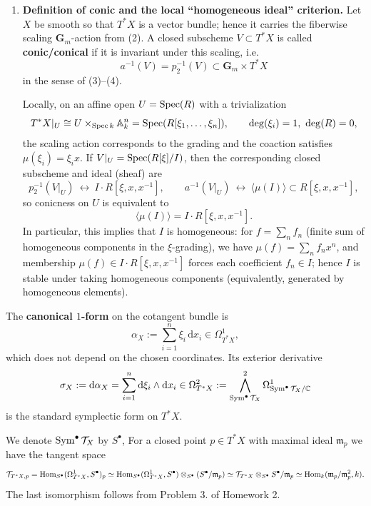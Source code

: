 \begin{remark}
\begin{enumerate}
        \item \textbf{Definition of conic and the local ``homogeneous ideal'' criterion.}
              Let $X$ be smooth so that $T^*X$ is a vector bundle; hence it carries the fiberwise scaling
              $\mathbf G_m$-action from (2). A closed subscheme $V\subset T^*X$ is called \textbf{conic/conical}
              if it is invariant under this scaling, i.e.
              \[
                  a^{-1}(V)=p_2^{-1}(V)\subset \mathbf G_m\times T^*X
              \]
              in the sense of (3)--(4).

              Locally, on an affine open $U=\operatorname{Spec}(R)$ with a trivialization
              \[
                  T^*X|_U \cong U\times_{\operatorname{Spec} k}\mathbb A^n_{k} = \operatorname{Spec}(R[\xi_1,\dots,\xi_n]),
                  \qquad \deg(\xi_i)=1,\ \deg(R)=0,
              \]
              the scaling action corresponds to the grading and the coaction satisfies $\mu(\xi_i)=\xi_i x$.
              If $V|_U=\operatorname{Spec}(R[\xi]/I)$, then the corresponding closed subscheme and ideal (sheaf) are
              \[
                  p_2^{-1}(V|_U)\ \leftrightarrow\ I\cdot R[\xi,x,x^{-1}],
                  \qquad
                  a^{-1}(V|_U)\ \leftrightarrow\ \langle \mu(I)\rangle\subset R[\xi,x,x^{-1}],
              \]
              so conicness on $U$ is equivalent to
              \[
                  \langle \mu(I)\rangle = I\cdot R[\xi,x,x^{-1}].
              \]
              In particular, this implies that $I$ is homogeneous: for $f=\sum_n f_n$ (finite sum of homogeneous
              components in the $\xi$-grading), we have $\mu(f)=\sum_n f_n x^n$, and membership
              $\mu(f)\in I\cdot R[\xi,x,x^{-1}]$ forces each coefficient $f_n\in I$; hence $I$ is stable under
              taking homogeneous components (equivalently, generated by homogeneous elements).
    \end{enumerate}
\end{remark}

\bigskip

\noindent The \textbf{canonical $1$-form} on the cotangent bundle is
\[
    \alpha_X := \sum_{i=1}^n \xi_i\,\text{d}x_i \in \Omega^1_{T^\ast X},
\]
which does not depend on the chosen coordinates.  Its exterior derivative
\[
    \sigma_X := \text{d}\alpha_X = \sum_{i=1}^n \text{d}\xi_i\wedge \text{d}x_i \in \Omega^2_{T^\ast X}:= \bigwedge^2_{\operatorname{Sym}^\bullet \mathcal{T}_X} \Omega^1_{\operatorname{Sym}^\bullet \mathcal{T}_X/\mathbb{C}}
\]
is the standard symplectic form on $T^\ast X$.

We denote $\operatorname{Sym}^\bullet \mathcal{T}_X$ by $S^\bullet$,
For a closed point $p\in T^\ast X$ with maximal ideal $\mathfrak m_p$ we have
the tangent space
\[
    \mathcal{T}_{T^\ast X,p}=\operatorname{Hom}_{S^\bullet}(\Omega^1_{T^\ast X},S^\bullet)_p
    \simeq \operatorname{Hom}_{S^\bullet}(\Omega^1_{T^\ast X},S^\bullet) \otimes_{S^\bullet} (S^\bullet/\mathfrak m_p)
    \simeq \mathcal{T}_{T^\ast X}\otimes_{S^\bullet} S^\bullet/\mathfrak m_p
    \simeq \operatorname{Hom}_k(\mathfrak m_p/\mathfrak m_p^2,k).
\]
The last isomorphism follows from Problem 3. of Homework 2.

